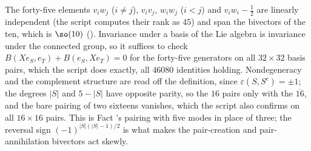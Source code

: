The forty-five elements $v_{i}w_{j}$ ($i \ne j$), $v_{i}v_{j}$, $w_{i}w_{j}$ ($i < j$) and $v_{i}w_{i} - \tfrac12$ are linearly independent (the script computes their rank as $45$) and span the bivectors of the ten, which is $\so(10)$ (). Invariance under a basis of the Lie algebra is invariance under the connected group, so it suffices to check $B(Xe_{S}, e_{T}) + B(e_{S}, Xe_{T}) = 0$ for the forty-five generators on all $32 \times 32$ basis pairs, which the script does exactly, all $46080$ identities holding. Nondegeneracy and the complement structure are read off the definition, since $\varepsilon(S, S^{c}) = \pm 1$; the degrees $|S|$ and $5 - |S|$ have opposite parity, so the $16$ pairs only with the $\overline{16}$, and the bare pairing of two sixteens vanishes, which the script also confirms on all $16 \times 16$ pairs. This is Fact 's pairing with five modes in place of three; the reversal sign $(-1)^{|S|(|S|-1)/2}$ is what makes the pair-creation and pair-annihilation bivectors act skewly.
